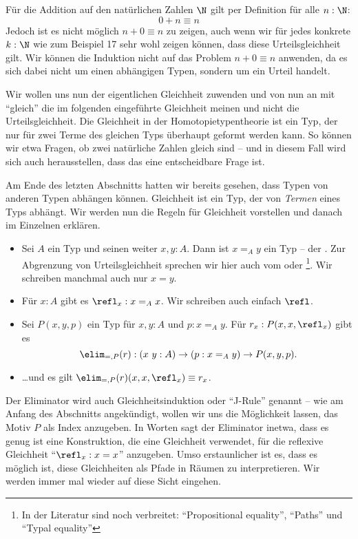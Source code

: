 Für die Addition auf den natürlichen Zahlen $\N$ gilt per Definition für alle $n:\N$:
\[
  0+n\equiv n
\]
Jedoch ist es nicht möglich $n+0\equiv n$ zu zeigen, auch wenn wir für jedes konkrete $k:\N$ wie zum Beispiel 17 sehr wohl zeigen können, dass diese Urteilsgleichheit gilt.
Wir können die Induktion nicht auf das Problem $n+0\equiv n$ anwenden, da es sich dabei nicht um einen abhängigen Typen, sondern um ein Urteil handelt.

Wir wollen uns nun der eigentlichen Gleichheit zuwenden und von nun an mit ``gleich'' die im folgenden eingeführte Gleichheit meinen und nicht die Urteilsgleichheit.
Die Gleichheit in der Homotopietypentheorie ist ein Typ, der nur für zwei Terme des gleichen Typs überhaupt geformt werden kann.
So können wir etwa Fragen, ob zwei natürliche Zahlen gleich sind -- und in diesem Fall wird sich auch herausstellen, dass das eine entscheidbare Frage ist.

Am Ende des letzten Abschnitts hatten wir bereits gesehen, dass Typen von anderen Typen abhängen können. Gleichheit ist ein Typ, der von \emph{Termen} eines Typs abhängt.
Wir werden nun die Regeln für Gleichheit vorstellen und danach im Einzelnen erklären.

\begin{regeln}
\begin{itemize}
\item Sei $A$ ein Typ und seinen weiter $x,y:A$. Dann ist $x=_Ay$ ein Typ -- der . Zur Abgrenzung von Urteilsgleichheit sprechen wir hier auch vom  oder \footnote{In der Literatur sind noch verbreitet: ``Propositional equality'', ``Paths'' und ``Typal equality''}. Wir schreiben manchmal auch nur $x=y$.
\item Für $x:A$ gibt es $\refl_x:x=_Ax$. Wir schreiben auch einfach $\refl$.
\item Sei $P(x,y, p)$ ein Typ für $x,y:A$ und $ p:x=_Ay$.
  Für $r_{x}:P(x,x,\refl_x)$ gibt es
  \[
    \elim_{=,P}(r):(x\ y : A) \to ( p : x=_Ay) \to P(x,y, p)\rlap{.}
  \]
\item \dots und es gilt $\elim_{=,P}(r)(x,x,\refl_x)\equiv r_x$.
\end{itemize}
\end{regeln}

Der Eliminator wird auch Gleichheitsinduktion oder ``J-Rule'' genannt -- wie am Anfang des Abschnitts angekündigt, wollen wir uns die Möglichkeit lassen, das Motiv $P$ als Index anzugeben.
In Worten sagt der Eliminator inetwa, dass es genug ist eine Konstruktion, die eine Gleichheit verwendet, für die reflexive Gleichheit ``$\refl_x:x=x$'' anzugeben.
Umso erstaunlicher ist es, dass es möglich ist, diese Gleichheiten als Pfade in Räumen zu interpretieren. Wir werden immer mal wieder auf diese Sicht eingehen.


